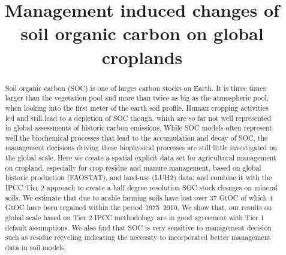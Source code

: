 \documentclass[gc, manuscript]{copernicus}
\begin{document}
\title{Management induced changes of soil organic carbon on global croplands}











\received{}
\pubdiscuss{} %
\revised{}
\accepted{}
\published{}




\maketitle


\begin{abstract}
Soil organic carbon (SOC) is one of larges carbon stocks on Earth. It is three times larger than the vegetation pool and more than twice as big as the atmospheric pool, when looking into the first meter of the earth soil profile. Human cropping activities led and still lead to a depletion of SOC though, which are so far not well represented in global assessments of historic carbon emissions. While SOC models often represent well the biochemical processes that lead to the accumulation and decay of SOC, the management decisions driving these biophysical processes are still little investigated on the global scale. Here we create a spatial explicit data set for agricultural management on cropland, especially for crop residue and manure management, based on global historic production (FAOSTAT), and land-use (LUH2) data; and combine it with the IPCC Tier 2 approach to create a half degree resolution SOC stock changes on mineral soils. We estimate that due to arable farming soils have lost over 37 GtOC of which 4 GtOC have been regained within the period 1975--2010. We show that, our results on global scale based on Tier 2 IPCC methodology are in good agreement with Tier 1 default assumptions. We also find that SOC is very sensitive to management decision such as residue recycling indicating the necessity to incorporated better management data in soil models.
\end{abstract}
\end{document}
